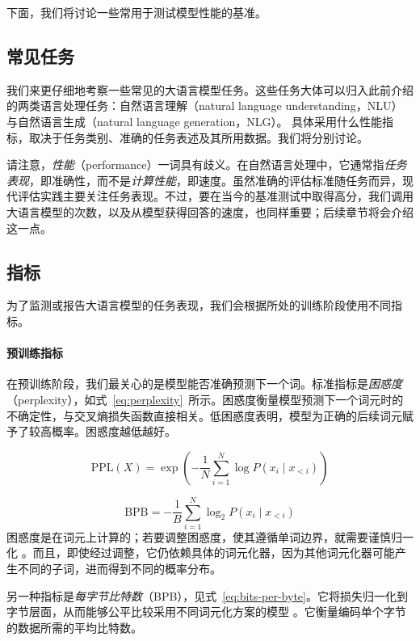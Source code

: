 下面，我们将讨论一些常用于测试模型性能的基准。

\subsection{常见任务}
我们来更仔细地考察一些常见的大语言模型任务。这些任务大体可以归入此前介绍的两类语言处理任务：自然语言理解（natural language understanding，NLU）与自然语言生成（natural language generation，NLG）。
具体采用什么性能指标，取决于任务类别、准确的任务表述及其所用数据。我们将分别讨论。

请注意，{\em 性能}（performance）一词具有歧义。在自然语言处理中，它通常指\emph{任务表现}，即准确性，而不是\emph{计算性能}，即速度。虽然准确的评估标准随任务而异，现代评估实践主要关注任务表现。不过，要在当今的基准测试中取得高分，我们调用大语言模型的次数，以及从模型获得回答的速度，也同样重要；后续章节将会介绍这一点。

\subsection{指标}\label{sec:metrics}
为了监测或报告大语言模型的任务表现，我们会根据所处的训练阶段使用不同指标。

\paragraph{预训练指标}
在预训练阶段，我们最关心的是模型能否准确预测下一个词。标准指标是{\em 困惑度}（perplexity），如式~\ref{eq:perplexity}~所示。困惑度衡量模型预测下一个词元时的不确定性，与交叉熵损失函数直接相关。低困惑度表明，模型为正确的后续词元赋予了较高概率。困惑度越低越好。

\begin{equation}
    \text{PPL}(X) = \exp \left( - \frac{1}{N} \sum_{i=1}^N \log P(x_i \mid x_{<i}) \right)
    \label{eq:perplexity}
\end{equation}

\begin{equation}
    \text{BPB} = - \frac{1}{B} \sum_{i=1}^N \log_2 P(x_i \mid x_{<i})
    \label{eq:bits-per-byte}
\end{equation}
困惑度是在词元上计算的；若要调整困惑度，使其遵循单词边界，就需要谨慎归一化 \citep{pimentel-meister-2024-compute}。而且，即使经过调整，它仍依赖具体的词元化器，因为其他词元化器可能产生不同的子词，进而得到不同的概率分布。

另一种指标是\emph{每字节比特数}（BPB），见式~\ref{eq:bits-per-byte}。它将损失归一化到字节层面，从而能够公平比较采用不同词元化方案的模型 \citep{borgeaud2022improving}。它衡量编码单个字节的数据所需的平均比特数。

